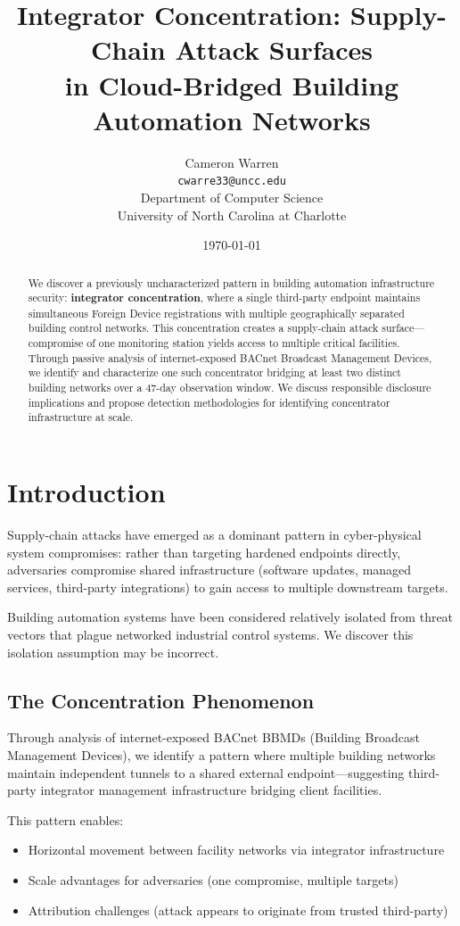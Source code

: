 \documentclass[11pt,a4paper]{article}
\title{\textbf{Integrator Concentration}: Supply-Chain Attack Surfaces\\
       in Cloud-Bridged Building Automation Networks}
\author{Cameron Warren\\
  \texttt{cwarre33@uncc.edu}\\[0.5em]
  Department of Computer Science\\
  University of North Carolina at Charlotte
}
\date{\today}
\begin{document}
\maketitle

\begin{abstract}
We discover a previously uncharacterized pattern in building automation 
infrastructure security: \textbf{integrator concentration}, where a single 
third-party endpoint maintains simultaneous Foreign Device registrations 
with multiple geographically separated building control networks. This 
concentration creates a supply-chain attack surface---compromise of one 
monitoring station yields access to multiple critical facilities. Through 
passive analysis of internet-exposed BACnet Broadcast Management Devices, 
we identify and characterize one such concentrator bridging at least two 
distinct building networks over a 47-day observation window. We discuss 
responsible disclosure implications and propose detection methodologies 
for identifying concentrator infrastructure at scale.
\end{abstract}

\section{Introduction}
\label{sec:intro}

Supply-chain attacks have emerged as a dominant pattern in cyber-physical 
system compromises: rather than targeting hardened endpoints directly, 
adversaries compromise shared infrastructure (software updates, managed 
services, third-party integrations) to gain access to multiple downstream 
targets.

Building automation systems have been considered relatively isolated from 
threat vectors that plague networked industrial control systems. We 
discover this isolation assumption may be incorrect.

\subsection{The Concentration Phenomenon}

Through analysis of internet-exposed BACnet BBMDs (Building Broadcast 
Management Devices), we identify a pattern where multiple building networks 
maintain independent tunnels to a shared external endpoint---suggesting 
third-party integrator management infrastructure bridging client facilities.

This pattern enables:
\begin{itemize}
  \item Horizontal movement between facility networks via integrator infrastructure
  \item Scale advantages for adversaries (one compromise, multiple targets)
  \item Attribution challenges (attack appears to originate from trusted third-party)
\end{itemize}
\end{document}
